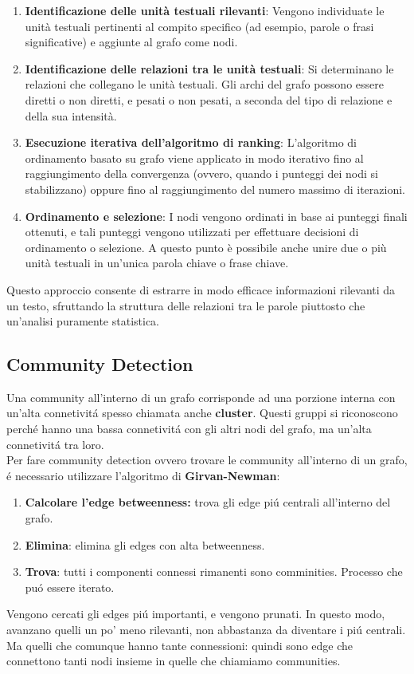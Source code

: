 \begin{enumerate}
  \item \textbf{Identificazione delle unità testuali rilevanti}: Vengono individuate le unità testuali pertinenti al compito specifico (ad esempio, parole o frasi significative) e aggiunte al grafo come nodi.

  \item \textbf{Identificazione delle relazioni tra le unità testuali}: Si determinano le relazioni che collegano le unità testuali. Gli archi del grafo possono essere diretti o non diretti, e pesati o non pesati, a seconda del tipo di relazione e della sua intensità.

  \item \textbf{Esecuzione iterativa dell'algoritmo di ranking}: L'algoritmo di ordinamento basato su grafo viene applicato in modo iterativo fino al raggiungimento della convergenza (ovvero, quando i punteggi dei nodi si stabilizzano) oppure fino al raggiungimento del numero massimo di iterazioni.

  \item \textbf{Ordinamento e selezione}: I nodi vengono ordinati in base ai punteggi finali ottenuti, e tali punteggi vengono utilizzati per effettuare decisioni di ordinamento o selezione. A questo punto è possibile anche unire due o più unità testuali in un’unica parola chiave o frase chiave.
\end{enumerate}

Questo approccio consente di estrarre in modo efficace informazioni rilevanti da un testo, sfruttando la struttura delle relazioni tra le parole piuttosto che un'analisi puramente statistica.

\newpage

\subsection{Community Detection}
Una community all'interno di un grafo corrisponde ad una porzione interna con un'alta connetivitá spesso chiamata anche \textbf{cluster}. Questi gruppi si riconoscono perché hanno una bassa connetivitá con gli altri nodi del grafo, ma un'alta connetivitá tra loro. 
\\
Per fare community detection ovvero trovare le community all'interno di un grafo, é necessario utilizzare l'algoritmo di \textbf{Girvan-Newman}: 
\begin{enumerate}
    \item \textbf{Calcolare l'edge betweenness:} trova gli edge piú centrali all'interno del grafo.
    \item \textbf{Elimina}: elimina gli edges con alta betweenness.
    \item \textbf{Trova}: tutti i componenti connessi rimanenti sono comminities. Processo che puó essere iterato. 
\end{enumerate}
Vengono cercati gli edges piú importanti, e vengono prunati. In questo modo, avanzano quelli un po' meno rilevanti, non abbastanza da diventare i piú centrali. Ma quelli che comunque hanno tante connessioni: quindi sono edge che connettono tanti nodi insieme in quelle che chiamiamo communities. 

